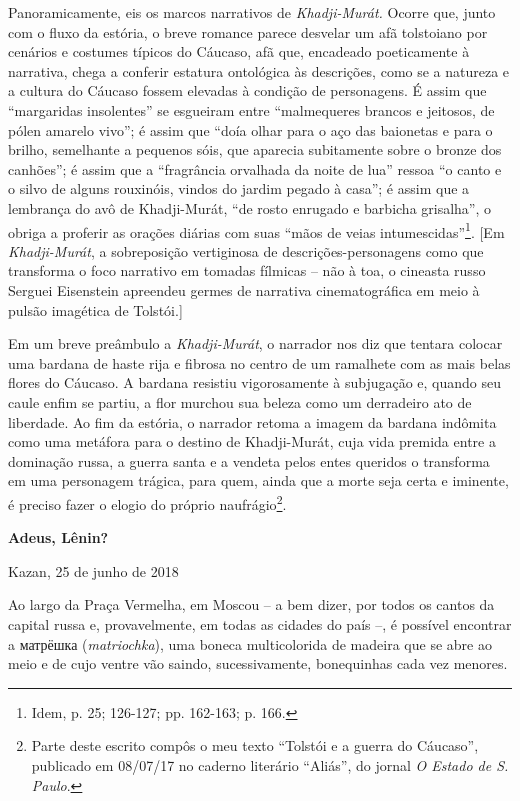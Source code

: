 Panoramicamente, eis os marcos narrativos de \emph{Khadji-Murát.} Ocorre
que, junto com o fluxo da estória, o breve romance parece desvelar um
afã tolstoiano por cenários e costumes típicos do Cáucaso, afã que,
encadeado poeticamente à narrativa, chega a conferir estatura ontológica
às descrições, como se a natureza e a cultura do Cáucaso fossem elevadas
à condição de personagens. É assim que ``margaridas insolentes'' se
esgueiram entre ``malmequeres brancos e jeitosos, de pólen amarelo
vivo''; é assim que ``doía olhar para o aço das baionetas e para o
brilho, semelhante a pequenos sóis, que aparecia subitamente sobre o
bronze dos canhões''; é assim que a ``fragrância orvalhada da noite de
lua'' ressoa ``o canto e o silvo de alguns rouxinóis, vindos do jardim
pegado à casa''; é assim que a lembrança do avô de Khadji-Murát, ``de
rosto enrugado e barbicha grisalha'', o obriga a proferir as orações
diárias com suas ``mãos de veias intumescidas''\footnote{Idem, p. 25;
  126-127; pp. 162-163; p. 166.}. {[}Em \emph{Khadji-Murát}, a
sobreposição vertiginosa de descrições-personagens como que transforma o
foco narrativo em tomadas fílmicas -- não à toa, o cineasta russo
Serguei Eisenstein apreendeu germes de narrativa cinematográfica em meio
à pulsão imagética de Tolstói.{]}

Em um breve preâmbulo a \emph{Khadji-Murát}, o narrador nos diz que
tentara colocar uma bardana de haste rija e fibrosa no centro de um
ramalhete com as mais belas flores do Cáucaso. A bardana resistiu
vigorosamente à subjugação e, quando seu caule enfim se partiu, a flor
murchou sua beleza como um derradeiro ato de liberdade. Ao fim da
estória, o narrador retoma a imagem da bardana indômita como uma
metáfora para o destino de Khadji-Murát, cuja vida premida entre a
dominação russa, a guerra santa e a vendeta pelos entes queridos o
transforma em uma personagem trágica, para quem, ainda que a morte seja
certa e iminente, é preciso fazer o elogio do próprio
naufrágio\footnote{Parte deste escrito compôs o meu texto ``Tolstói e a
  guerra do Cáucaso'', publicado em 08/07/17 no caderno literário
  ``Aliás'', do jornal \emph{O Estado de S. Paulo}.}.

\textbf{Adeus, Lênin?}

Kazan, 25 de junho de 2018

Ao largo da Praça Vermelha, em Moscou -- a bem dizer, por todos os
cantos da capital russa e, provavelmente, em todas as cidades do país
--, é possível encontrar a матрёшка (\emph{matriochka}), uma boneca
multicolorida de madeira que se abre ao meio e de cujo ventre vão
saindo, sucessivamente, bonequinhas cada vez menores.

